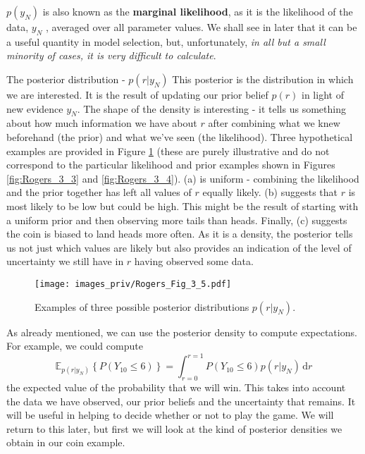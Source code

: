 $p(y_N)$ is also known as the \textbf{marginal likelihood}, as it is the likelihood of the
data, $y_N$ , averaged over all parameter values. We shall see in later that it
can be a useful quantity in model selection, but, unfortunately, \emph{in all but a small
minority of cases, it is very difficult to calculate}.

The posterior distribution - $p(r|y_N)$
This posterior is the distribution in
which we are interested. It is the result of updating our prior belief $p(r)$ in light of
new evidence $y_N$. The shape of the density is interesting - it tells us something about
how much information we have about $r$ after combining what we knew beforehand
(the prior) and what we've seen (the likelihood).
Three hypothetical examples are
provided in Figure \ref{fig:Rogers_3_5}
(these are purely illustrative and do not correspond to the
particular likelihood and prior examples shown in Figures \ref{fig:Rogers_3_3}
and \ref{fig:Rogers_3_4}).
(a) is uniform - combining the likelihood and the prior together has left all values of
$r$ equally likely.
(b) suggests that $r$ is most likely to be low but could be high. This might be the
result of starting with a uniform prior and then observing more tails than heads.
Finally, (c) suggests the coin is biased to land heads more often. As it is a density,
the posterior tells us not just which values are likely but also provides an indication
of the level of uncertainty we still have in $r$ having observed some data.

\begin{figure}[h]
{\centering
\texttt{[image: images\_priv/Rogers\_Fig\_3\_5.pdf]}
\par}
\caption{Examples of three possible posterior distributions $p(r|y_N)$.}
\label{fig:Rogers_3_5}
\end{figure}

As already mentioned, we can use the posterior density to compute expectations.
For example, we could compute
\begin{equation*}
\mathbb{E}_{p(r|y_N)} \left\{ P(Y_{10} \leq 6) \right\} =
\int_{r=0}^{r=1} P(Y_{10} \leq 6) p(r|y_N) \, \mathrm{d}r
\end{equation*}
the expected value of the probability that we will win. This takes into account the
data we have observed, our prior beliefs and the uncertainty that remains. It will be
useful in helping to decide whether or not to play the game. We will return to this
later, but first we will look at the kind of posterior densities we obtain in our coin
example.

